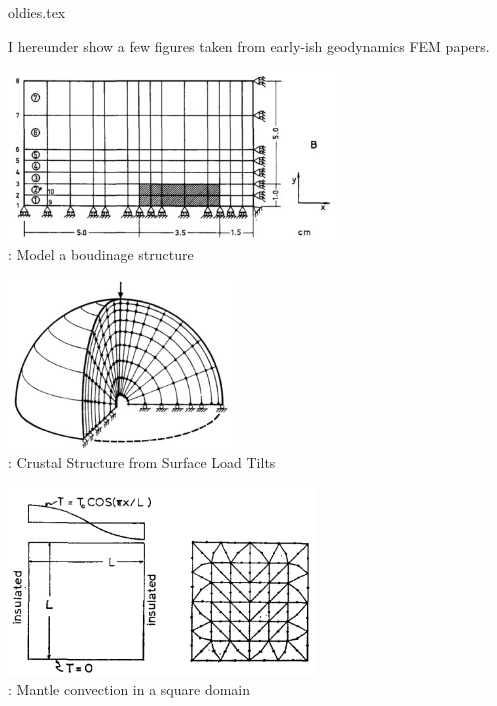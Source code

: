 \begin{flushright} {\tiny {\color{gray} oldies.tex}} \end{flushright}

I hereunder show a few figures taken from early-ish geodynamics FEM papers.


\begin{center}
\begin{minipage}{0.45\textwidth}
\centering
\includegraphics[height=4.5cm]{images/history/stbe71}\\
{: Model a boudinage structure \cite{stbe71}}
\end{minipage}\hfill
\begin{minipage}{0.45\textwidth}
\centering
\includegraphics[height=4.5cm]{images/history/bela72}\\
{: Crustal Structure from Surface Load Tilts \cite{bela72}}
\end{minipage}
\end{center}


\begin{center}
\includegraphics[height=5cm]{images/history/sath76}\\
{: Mantle convection in a square domain \cite{sath76}}
\end{center}

